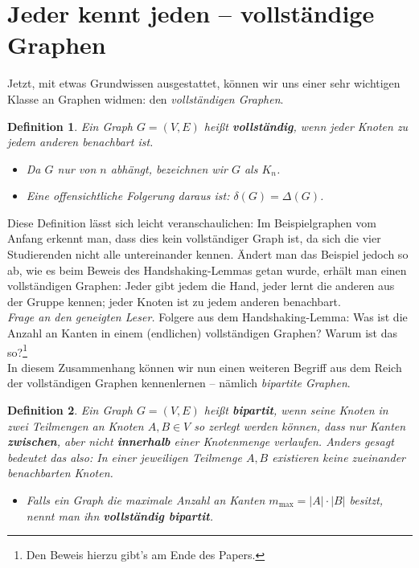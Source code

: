 \documentclass{article}
\newtheorem{definition}{Definition}
\theoremstyle{plain}
\begin{document}
\section{Jeder kennt jeden -- vollständige Graphen}
Jetzt, mit etwas Grundwissen ausgestattet, können wir uns einer sehr wichtigen Klasse an Graphen widmen: den \emph{vollständigen Graphen}.\\
\begin{definition}
	Ein Graph $G = (V, E)$ heißt \textbf{vollständig}, wenn jeder Knoten zu jedem anderen benachbart ist.
	\begin{itemize}
		\item[$\rightarrow$] Da $G$ nur von $n$ abhängt, bezeichnen wir $G$ als $K_n$.
		\item[$\rightarrow$] Eine offensichtliche Folgerung daraus ist: $\delta(G) = \Delta(G)$.\cite[S.~6]{bue_1}
	\end{itemize}
\end{definition}
\bigskip
Diese Definition lässt sich leicht veranschaulichen: Im Beispielgraphen vom Anfang erkennt man, dass dies kein vollständiger Graph ist, da sich die vier Studierenden nicht alle untereinander kennen. Ändert man das Beispiel jedoch so ab, wie es beim Beweis des Handshaking-Lemmas getan wurde, erhält man einen vollständigen Graphen: Jeder gibt jedem die Hand, jeder lernt die anderen aus der Gruppe kennen; jeder Knoten ist zu jedem anderen benachbart.\\
\bigskip
\emph{Frage an den geneigten Leser.} Folgere aus dem Handshaking-Lemma: Was ist die Anzahl an Kanten in einem (endlichen) vollständigen Graphen? Warum ist das so?\footnote[1]{Den Beweis hierzu gibt's am Ende des Papers.}\\
\bigskip
In diesem Zusammenhang können wir nun einen weiteren Begriff aus dem Reich der vollständigen Graphen kennenlernen -- nämlich \emph{bipartite Graphen}.\\
\begin{definition}
	Ein Graph $G = (V, E)$ heißt \textbf{bipartit}, wenn seine Knoten in zwei Teilmengen an Knoten $A, B \in V$ so zerlegt werden können, dass nur Kanten \textbf{zwischen}, aber nicht \textbf{innerhalb} einer Knotenmenge verlaufen. Anders gesagt bedeutet das also: In einer jeweiligen Teilmenge $A, B$ existieren keine zueinander benachbarten Knoten.
	\begin{itemize}
		\item[$\rightarrow$] Falls ein Graph die \emph{maximale Anzahl an Kanten} $m_{\mathrm{max}} = |A| \cdot |B|$ besitzt, nennt man ihn \textbf{vollständig bipartit}.\cite[S.~7]{bue_1}
	\end{itemize}
\end{definition}
\end{document}
